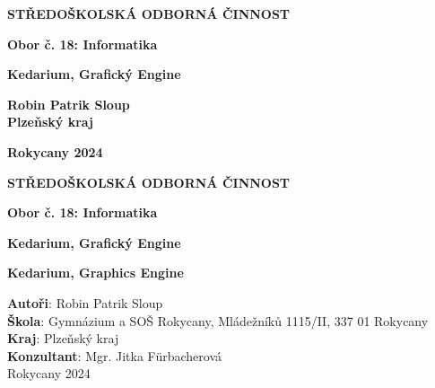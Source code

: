 \begin{titlepage}
    \begin{center}
        {\Large \textbf{STŘEDOŠKOLSKÁ ODBORNÁ ČINNOST} \par}
        \textbf{Obor č. 18: Informatika}
    \end{center}
    \vspace*{\fill}
    \begin{center} 
        {\Large \textbf{Kedarium, Grafický Engine}\par}
    \end{center}
    \vspace*{\fill}
    \begin{center}
        \begin{minipage}[t]{0.5\textwidth}
            \textbf{Robin Patrik Sloup}\\
            \textbf{Plzeňský kraj}
        \end{minipage}%
        \begin{minipage}[t]{0.5\textwidth}
            \raggedleft
            \break
            \textbf{Rokycany 2024}
        \end{minipage}
    \end{center}
    \thispagestyle{empty}
    \pagebreak
    \begin{center}
        {\Large \textbf{STŘEDOŠKOLSKÁ ODBORNÁ ČINNOST} \par}
        \textbf{Obor č. 18: Informatika}
    \end{center}
    \vspace*{\fill}
    \begin{center} 
        {\Large \textbf{Kedarium, Grafický Engine}\par}
        \vspace{0.3cm}
        {\Large \textbf{Kedarium, Graphics Engine}\par}
    \end{center}
    \vspace*{\fill}
    \textbf{Autoři}: Robin Patrik Sloup \\
    \textbf{Škola}: Gymnázium a SOŠ Rokycany, Mládežníků 1115/II, 337 01 Rokycany\\
    \textbf{Kraj}: Plzeňský kraj \\
    \textbf{Konzultant}: Mgr. Jitka Fürbacherová \\

    \noindent Rokycany 2024
    \thispagestyle{empty}
\end{titlepage}
